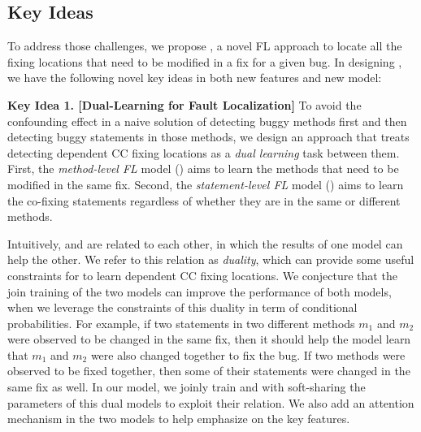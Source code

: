 \subsection{Key Ideas}
\label{sec:key-ideas}

To address those challenges, we propose {\tool}, a novel FL approach
to locate all the fixing locations that need to be modified in a fix
for a given bug. In designing {\tool}, we have the following novel key
ideas in both new features and new model:

{\bf Key Idea 1. [Dual-Learning for Fault Localization]} To avoid the
confounding effect in a naive solution of detecting buggy methods
first and then detecting buggy statements in those methods, we design
an approach that treats detecting dependent CC fixing locations as a
{\em dual learning} task between them. First, the {\em method-level
  FL} model () aims to learn the methods that need
to be modified in the same fix. Second, the {\em statement-level
  FL} model () aims to learn the co-fixing
statements regardless of whether they are in the same or different
methods.

Intuitively,  and  are related to each
other, in which the results of one model can help the other. We refer
to this relation as {\em duality}, which can provide some useful
constraints for {\tool} to learn dependent CC fixing locations.
%
We conjecture that the join training of the two models can improve the
performance of both models, when we leverage the constraints of this
duality in term of conditional probabilities. For example, if two
statements in two different methods $m_1$ and $m_2$ were observed to
be changed in the same fix, then it should help the model learn that
$m_1$ and $m_2$ were also changed together to fix the bug.  If two
methods were observed to be fixed together, then some of their
statements were changed in the same fix as well. In our model, we
joinly train  and  with soft-sharing the
parameters of this dual models to exploit their relation. We also add
an attention mechanism in the two models to help emphasize on the key
features.




